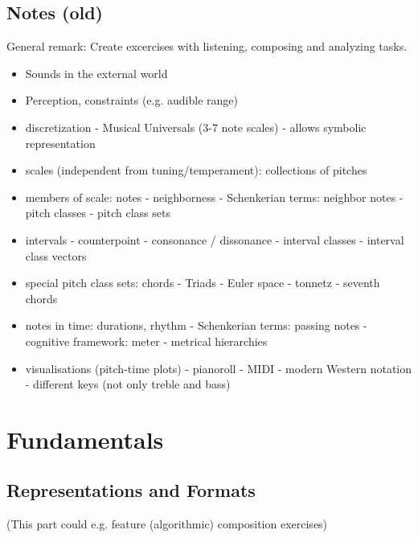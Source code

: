 \documentclass[letterpaper,10pt,english]{sphinxmanual}
\begin{document}
\section{Notes (old)}
\label{\detokenize{0_intro:notes-old}}
General remark: Create excercises with listening, composing and analyzing tasks.
\begin{itemize}
\item {} 
Sounds in the external world

\item {} 
Perception, constraints (e.g. audible range)

\item {} 
discretization
- Musical Universals (3-7 note scales)
- allows symbolic representation

\item {} 
scales (independent from tuning/temperament): collections of pitches

\item {} 
members of scale: notes
- neighborness
- Schenkerian terms: neighbor notes
- pitch classes
- pitch class sets

\item {} 
intervals
- counterpoint
- consonance / dissonance
- interval classes
- interval class vectors

\item {} 
special pitch class sets: chords
- Triads
- Euler space
- tonnetz
- seventh chords

\item {} 
notes in time: durations, rhythm
- Schenkerian terms: passing notes
- cognitive framework: meter
- metrical hierarchies

\item {} 
visualisations (pitch-time plots)
- pianoroll
- MIDI
- modern Western notation
- different keys (not only treble and bass)

\end{itemize}


\chapter{Fundamentals}
\label{\detokenize{1_fundamentals:fundamentals}}\label{\detokenize{1_fundamentals::doc}}

\section{Representations and Formats}
\label{\detokenize{1_fundamentals:representations-and-formats}}
(This part could e.g. feature (algorithmic) composition exercises)
\end{document}
